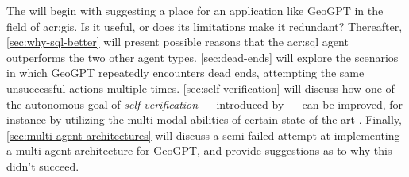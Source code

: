 \begin{comment}

In this section it is important to include a discussion of not just the merits of the work conducted, but also the limitations.
Which choices did you make? Why? What alternatives were there?
{\color{red}\textbf{Note that a key part of the Master's Thesis grading is based on the student's ability to discuss the results in light of the work by others as well as the restrictions and potential of the work itself.}}
While the Results section will report the outcome of each specific experiments, the Discussion should put those results into perspective and look at overall lessons that can be learned from the entire series of experiments.

You should be able to discuss your work in relation to its overall goal and your research questions (i.e., those introduced in Chapter~\ref{cha:introduction}),
but also address issues such as any ethical considerations that the work may entail,
as well as its technical challenges and limitations.

Discussion and evaluation can either be two different chapters, a joint chapter (as here), or part of the concluding chapter
--- or the discussion can be part of that chapter while the evaluation is part of the experimental chapter.

As for most parts of the thesis, it is possible to select various outlines and setups for the discussion; the important thing is that all the relevant parts appear \textit{somewhere\/} in the text.
\end{comment}

The  will begin with suggesting a place for an application like GeoGPT in the field of \acrshort{acr:gis}. Is it useful, or does its limitations make it redundant? Thereafter, \autoref{sec:why-sql-better} will present possible reasons that the \acrshort{acr:sql} agent outperforms the two other agent types. \autoref{sec:dead-ends} will explore the scenarios in which GeoGPT repeatedly encounters dead ends, attempting the same unsuccessful actions multiple times. \autoref{sec:self-verification} will discuss how one of the autonomous goal of \textit{self-verification} --- introduced by \cite{liAutonomousGISNextgeneration2023} --- can be improved, for instance by utilizing the multi-modal abilities of certain state-of-the-art . Finally, \autoref{sec:multi-agent-architectures} will discuss a semi-failed attempt at implementing a multi-agent architecture for GeoGPT, and provide suggestions as to why this didn't succeed.

